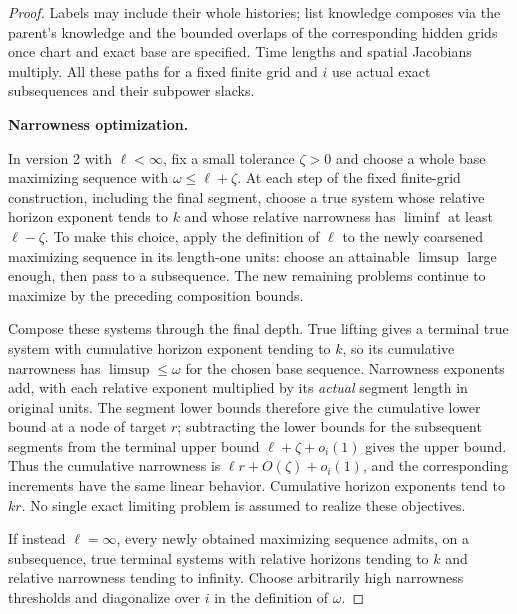\begin{proof}
Labels may include their whole histories; list knowledge composes via the parent's knowledge and the bounded overlaps of the corresponding hidden grids once chart and exact base are specified. Time lengths and spatial Jacobians multiply. All these paths for a fixed finite grid and \(i\) use actual exact subsequences and their subpower slacks.

\par\smallskip\noindent\textbf{Narrowness optimization.}\quad

In version 2 with \(\ell<\infty\), fix a small tolerance \(\zeta>0\)
and choose a whole base maximizing sequence with
\(\omega\le\ell+\zeta\).  At each step of the fixed finite-grid
construction, including the final segment, choose a true system whose
relative horizon exponent tends to \(k\) and whose relative narrowness
has \(\liminf\) at least \(\ell-\zeta\).  To make this choice, apply
the definition of \(\ell\) to the newly coarsened maximizing sequence
in its length-one units: choose an attainable \(\limsup\) large enough,
then pass to a subsequence.  The new remaining problems continue to
maximize by the preceding composition bounds.

Compose these systems through the final depth.  True lifting gives a
terminal true system with cumulative horizon exponent tending to
\(k\), so its cumulative narrowness has \(\limsup\le\omega\) for the
chosen base sequence.  Narrowness exponents add, with each relative
exponent multiplied by its \emph{actual} segment length in original
units.  The segment lower bounds therefore give the cumulative lower
bound at a node of target \(r\); subtracting the lower bounds for the
subsequent segments from the terminal upper bound
\(\ell+\zeta+o_i(1)\) gives the upper bound.  Thus the cumulative
narrowness is \(\ell r+O(\zeta)+o_i(1)\), and the corresponding
increments have the same linear behavior.  Cumulative horizon
exponents tend to \(kr\).  No single exact limiting problem is
assumed to realize these objectives.

If instead \(\ell=\infty\), every newly obtained maximizing sequence
admits, on a subsequence, true terminal systems with relative horizons
tending to \(k\) and relative narrowness tending to infinity.
Choose arbitrarily high narrowness thresholds and diagonalize over
\(i\) in the definition of \(\omega\).

\end{proof}

